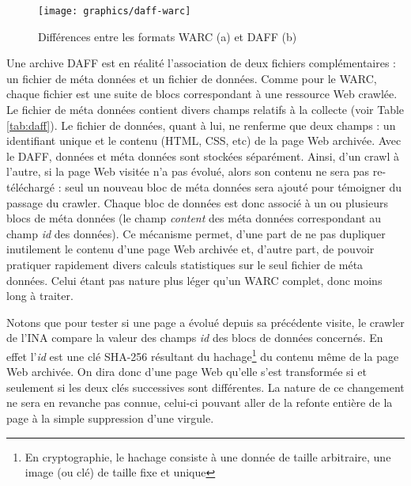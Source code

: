 \documentclass[symmetric,justified,marginals=raggedouter]{tufte-book}
\begin{document}
\begin{figure*}%
  \texttt{[image: graphics/daff-warc]}
  \caption{Différences entre les formats WARC (a) et DAFF (b)}
  \label{fig:daff-warc}
\end{figure*}

\noindent Une archive DAFF est en réalité l'association de deux fichiers complémentaires : un fichier de méta données et un fichier de données. Comme pour le WARC, chaque fichier est une suite de blocs correspondant à une ressource Web crawlée. Le fichier de méta données contient divers champs relatifs à la collecte (voir Table \ref{tab:daff}). Le fichier de données, quant à lui, ne renferme que deux champs : un identifiant unique et le contenu (HTML, CSS, etc) de la page Web archivée. Avec le DAFF, données et méta données sont stockées séparément. Ainsi, d'un crawl à l'autre, si la page Web visitée n'a pas évolué, alors son contenu ne sera pas re-téléchargé : seul un nouveau bloc de méta données sera ajouté pour témoigner du passage du crawler. Chaque bloc de données est donc associé à un ou plusieurs blocs de méta données (le champ \textit{content} des méta données correspondant au champ \textit{id} des données). Ce mécanisme permet, d'une part de ne pas dupliquer inutilement le contenu d'une page Web archivée et, d'autre part, de pouvoir pratiquer rapidement divers calculs statistiques sur le seul fichier de méta données. Celui étant pas nature plus léger qu'un WARC complet, donc moins long à traiter.

Notons que pour tester si une page a évolué depuis sa précédente visite, le crawler de l'INA compare la valeur des champs \textit{id} des blocs de données concernés. En effet l'\textit{id} est une clé SHA-256 résultant du hachage\footnote{En cryptographie, le hachage consiste à une donnée de taille arbitraire, une image (ou clé) de taille fixe et unique} du contenu même de la page Web archivée. On dira donc d'une page Web qu'elle s'est transformée si et seulement si les deux clés successives sont différentes. La nature de ce changement ne sera en revanche pas connue, celui-ci pouvant aller de la refonte entière de la page à la simple suppression d'une virgule.        
\end{document}
